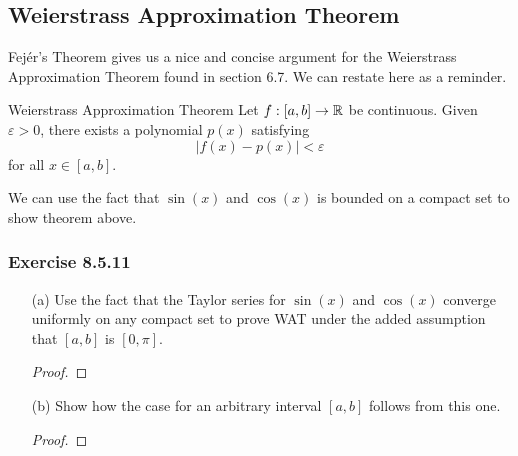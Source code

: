 \subsection{Weierstrass Approximation Theorem}

Fej\'{e}r's  Theorem gives us a nice and concise argument for the Weierstrass Approximation Theorem found in section 6.7. We can restate here as a reminder.

\begin{theorem}{Weierstrass Approximation Theorem}{}
    Let \( f : [a,b] \to \mathbb{R}  \) be continuous. Given \( \varepsilon > 0  \), there exists a polynomial \( p(x) \) satisfying 
    \[  | f(x) - p(x) | < \varepsilon \] for all \( x \in [a,b] \).
\end{theorem}

We can use the fact that \( \sin(x)  \) and \( \cos(x)  \) is bounded on a compact set to show theorem above.

\subsubsection{Exercise 8.5.11}
\begin{enumerate}
    \item[(a)] Use the fact that the Taylor series for \( \sin(x)  \) and \( \cos(x) \) converge uniformly on any compact set to prove WAT under the added assumption that \( [a,b] \) is \( [0, \pi] \).
        \begin{proof}
        
        \end{proof}
    \item[(b)] Show how the case for an arbitrary interval \( [a,b] \) follows from this one.
        \begin{proof}
        
        \end{proof}
\end{enumerate}





